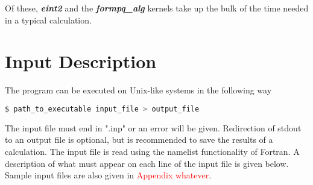 \documentclass[12pt]{report}
\newcommand{\notetodylan}[1]{\textcolor{red}{#1}} %
\newcommand{\kernel}[1]{\textit{\textbf{#1}}}
\begin{document}
Of these, \kernel{eint2} and the \kernel{formpq\_alg} kernels take up the bulk of the time needed in a typical calculation.

\section{Input Description}\label{inp_des}
The program can be executed on Unix-like systems in the following way
\begin{lstlisting}[language=bash]
	$ path_to_executable input_file > output_file
\end{lstlisting}

The input file must end in ".inp" or an error will be given. Redirection of stdout to an output file is optional, but is recommended to save the results of a calculation. The input file is read using the namelist functionality of Fortran. A description of what must appear on each line of the input file is given below. Sample input files are also given in \notetodylan{Appendix whatever}.
\end{document}
